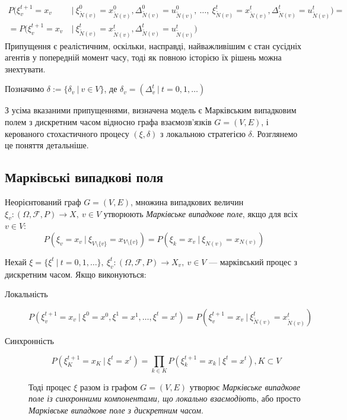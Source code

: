 \documentclass[oneside,draft,14pt]{extarticle}
\begin{document}
\begin{description}
	\begin{align*}
	P(\xi_v^{t+1} = x_v\ &|\ \xi_{\tilde N(v)}^0 = x_{\tilde N(v)}^0, \Delta_{\tilde N(v)}^0 = u_{\tilde N(v)}^0,\ \ldots,\ \xi_{\tilde N(v)}^t = x_{\tilde N(v)}^t, \Delta_{\tilde N(v)}^t = u_{\tilde N(v)}^t) = \\
	= P(\xi_v^{t+1} = x_v\ &|\ \xi_{\tilde N(v)}^t = x_{\tilde N(v)}^t, \Delta_{\tilde N(v)}^t = u_{\tilde N(v)}^t)
	\end{align*}
	Припущення є реалістичним, оскільки, насправді, найважливішим є стан сусідніх агентів у попередній момент часу, тоді як повною історією їх рішень можна знехтувати.
\end{description}

Позначимо \(\delta := \{\delta_v\ |\ v \in V\}\), де \(\delta_v = (\Delta_v^t\ |\  t=0,1,\ldots)\)

З усіма вказаними припущеннями, визначена модель є Марківським випадковим полем з дискретним часом відносно графа взаємозв’язків \(G = (V, E)\), і керованого стохастичного процесу \((\xi, \delta)\) з локальною стратегією \(\delta\). Розглянемо це поняття детальніше.

\subsection{Марківські випадкові поля}
\begin{definition}
Неорієнтований граф \(G = (V, E)\), множина випадкових величин \(\xi_v : (\Omega, \mathcal{F}, P) \rightarrow X,\ v \in V\) утворюють \textit{Марківське випадкове поле}, якщо для всіх \(v \in V\):
\[P(\xi_v = x_v\ |\ \xi_{V\setminus\{v\}} = x_{V\setminus\{v\}}) = P(\xi_k = x_v\ |\ \xi_{N(v)} = x_{N(v)})\]
\end{definition}

\begin{definition}
Нехай \(\xi = \{\xi^t\ |\ t=0,1,\ldots\},\ \xi^t_v : (\Omega, \mathcal{F}, P) \rightarrow X_v,\ v \in V \) — марківський процес з дискретним часом. 
Якщо виконуються:
\begin{description}
    \item[Локальність] \[P(\xi_v^{t+1} = x_v\ |\ \xi^0 = x^0, \xi^1 = x^1, \ldots, \xi^t = x^t) = P(\xi_v^{t+1} = x_v\ |\ \xi_{\tilde N(v)}^t = x_{\tilde N(v)}^t )\]
    \item[Синхронність] \[P(\xi^{t+1}_K = x_K\ |\ \xi^t = x^t) = \prod_{k \in K} P(\xi^{t+1}_k = x_k\ |\ \xi^t = x^t), K \subset V\]

Тоді процес \(\xi\) разом із графом \(G = (V, E)\) утворює \textit{Марківське випадкове поле із синхронними компонентами, що локально взаємодіють}, або просто \textit{Марківське випадкове поле з дискретним часом}.
\end{description}
\end{definition}


\clearpage

\nocite{David:1998}
\nocite{Knopov:2011}
\nocite{Knopov:1998}
\nocite{Chornei:2005}
\nocite{Koller:2009}



\end{document}

